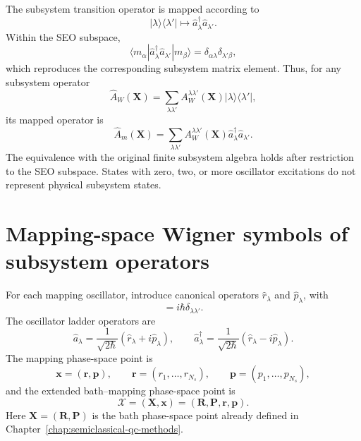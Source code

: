 \documentclass[
  11pt,
  letterpaper,
  onehalfspacing,
  normalmargins,
  equalmargins,
  oneside
]{ut-thesis}
\begin{document}
The subsystem transition operator is mapped according to
\begin{equation}
|\lambda\rangle\langle\lambda'|
\longmapsto
\hat a_\lambda^\dagger\hat a_{\lambda'}.
\label{eq:mmst-transition-operator-mapping}
\end{equation}
Within the SEO subspace,
\begin{equation}
\langle m_\alpha|
\hat a_\lambda^\dagger\hat a_{\lambda'}
|m_\beta\rangle
=
\delta_{\alpha\lambda}\delta_{\lambda'\beta},
\label{eq:mmst-transition-matrix-element}
\end{equation}
which reproduces the corresponding subsystem matrix element. Thus, for any
subsystem operator
\begin{equation}
\hat A_W(\mathbf X)
=
\sum_{\lambda\lambda'}
A_W^{\lambda\lambda'}(\mathbf X)
|\lambda\rangle\langle\lambda'|,
\label{eq:subsystem-operator-fixed-basis-ch3}
\end{equation}
its mapped operator is
\begin{equation}
\hat A_m(\mathbf X)
=
\sum_{\lambda\lambda'}
A_W^{\lambda\lambda'}(\mathbf X)
\hat a_\lambda^\dagger\hat a_{\lambda'}.
\label{eq:mapped-subsystem-operator}
\end{equation}
The equivalence with the original finite subsystem algebra holds after
restriction to the SEO subspace. States with zero, two, or more oscillator
excitations do not represent physical subsystem states.


\section{Mapping-space Wigner symbols of subsystem operators}
\label{sec:mapping-wigner-symbols}

For each mapping oscillator, introduce canonical operators
\(\hat r_\lambda\) and \(\hat p_\lambda\), with
\begin{equation}
[\hat r_\lambda,\hat p_{\lambda'}]
=
i\hbar\delta_{\lambda\lambda'}.
\label{eq:mapping-canonical-commutator}
\end{equation}
The oscillator ladder operators are
\begin{equation}
\hat a_\lambda
=
\frac{1}{\sqrt{2\hbar}}
(\hat r_\lambda+i\hat p_\lambda),
\qquad
\hat a_\lambda^\dagger
=
\frac{1}{\sqrt{2\hbar}}
(\hat r_\lambda-i\hat p_\lambda).
\label{eq:mapping-creation-annihilation-rp}
\end{equation}
The mapping phase-space point is
\begin{equation}
\mathbf x=(\mathbf r,\mathbf p),
\qquad
\mathbf r=(r_1,\ldots,r_{N_s}),
\qquad
\mathbf p=(p_1,\ldots,p_{N_s}),
\label{eq:mapping-phase-space-vector}
\end{equation}
and the extended bath--mapping phase-space point is
\begin{equation}
\boldsymbol{\mathcal X}
=
(\mathbf X,\mathbf x)
=
(\mathbf R,\mathbf P,\mathbf r,\mathbf p).
\label{eq:extended-phase-space-coordinate}
\end{equation}
Here \(\mathbf X=(\mathbf R,\mathbf P)\) is the bath phase-space point already
defined in Chapter~\ref{chap:semiclassical-qc-methods}.
\end{document}
